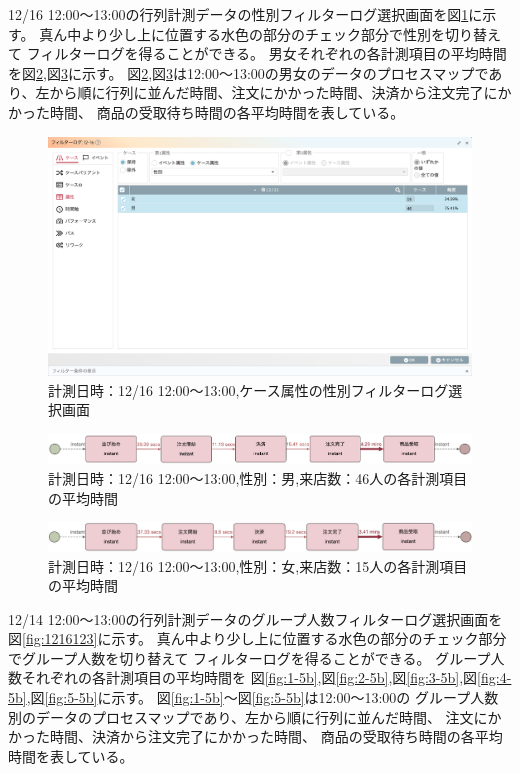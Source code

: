 \documentclass{jsarticle}
\begin{document}
12/16 12:00〜13:00の行列計測データの性別フィルターログ選択画面を図\ref{fig:1216mw}に示す。
真ん中より少し上に位置する水色の部分のチェック部分で性別を切り替えて
フィルターログを得ることができる。
男女それぞれの各計測項目の平均時間を図\ref{fig:man2},図\ref{fig:woman2}に示す。
図\ref{fig:man2},図\ref{fig:woman2}は12:00〜13:00の男女のデータのプロセスマップであり、左から順に行列に並んだ時間、注文にかかった時間、決済から注文完了にかかった時間、
商品の受取待ち時間の各平均時間を表している。

\begin{figure}[H]
  \centering
  \includegraphics[width=15cm]{1216mw.png}
  \caption{計測日時：12/16 12:00〜13:00,ケース属性の性別フィルターログ選択画面}
  \label{fig:1216mw}
\end{figure}

\begin{figure}[H]
  \centering
  \includegraphics[width=15cm]{man2.png}
  \caption{計測日時：12/16 12:00〜13:00,性別：男,来店数：46人の各計測項目の平均時間}
  \label{fig:man2}
\end{figure}
  
\begin{figure}[H]
  \centering
  \includegraphics[width=15cm]{woman2.png}
  \caption{計測日時：12/16 12:00〜13:00,性別：女,来店数：15人の各計測項目の平均時間}
  \label{fig:woman2}
\end{figure}


12/14 12:00〜13:00の行列計測データのグループ人数フィルターログ選択画面を図\ref{fig:1216123}に示す。
真ん中より少し上に位置する水色の部分のチェック部分でグループ人数を切り替えて
フィルターログを得ることができる。
グループ人数それぞれの各計測項目の平均時間を
図\ref{fig:1-5b},図\ref{fig:2-5b},図\ref{fig:3-5b},図\ref{fig:4-5b},図\ref{fig:5-5b}に示す。
図\ref{fig:1-5b}〜図\ref{fig:5-5b}は12:00〜13:00の
グループ人数別のデータのプロセスマップであり、左から順に行列に並んだ時間、
注文にかかった時間、決済から注文完了にかかった時間、
商品の受取待ち時間の各平均時間を表している。
\end{document}
